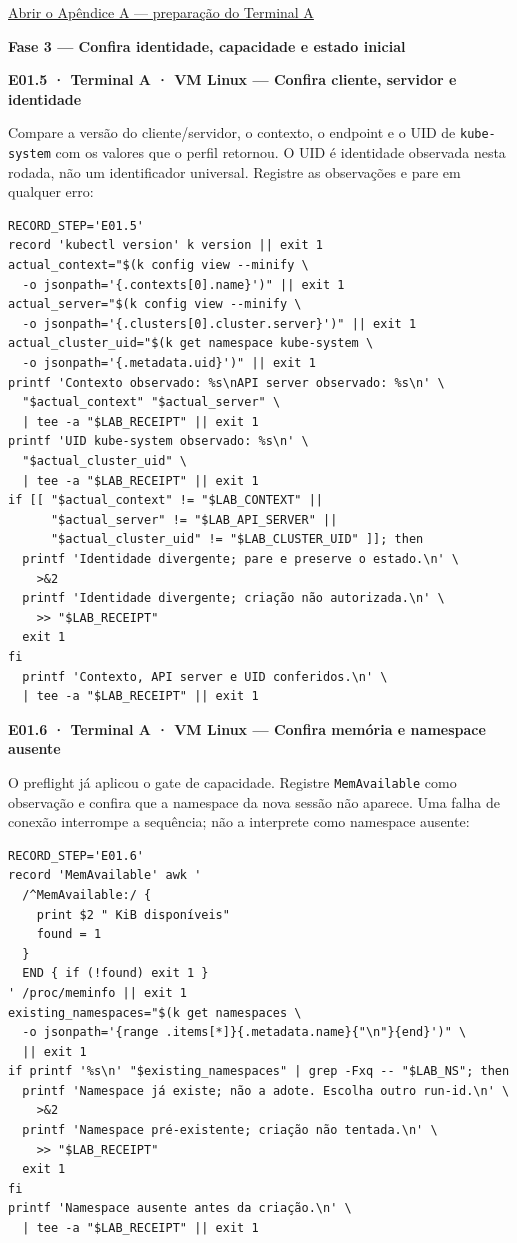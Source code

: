 \documentclass[12pt,openany,oneside,a4paper,chapter=TITLE,english,brazil]{abntex2}
\begin{document}
\hyperlink{p010-preparacao-terminal-a}{Abrir o Apêndice A — preparação do Terminal A}


\textbf{Fase 3 --- Confira identidade, capacidade e estado inicial}

\textbf{E01.5 · Terminal A · VM Linux --- Confira cliente, servidor e identidade}

Compare a versão do cliente/servidor, o contexto, o endpoint e o UID de \texttt{kube-{}\allowbreak{}system} com os valores que o perfil retornou. O UID é identidade observada nesta rodada, não um identificador universal. Registre as observações e pare em qualquer erro:

\begin{verbatim}
RECORD_STEP='E01.5'
record 'kubectl version' k version || exit 1
actual_context="$(k config view --minify \
  -o jsonpath='{.contexts[0].name}')" || exit 1
actual_server="$(k config view --minify \
  -o jsonpath='{.clusters[0].cluster.server}')" || exit 1
actual_cluster_uid="$(k get namespace kube-system \
  -o jsonpath='{.metadata.uid}')" || exit 1
printf 'Contexto observado: %s\nAPI server observado: %s\n' \
  "$actual_context" "$actual_server" \
  | tee -a "$LAB_RECEIPT" || exit 1
printf 'UID kube-system observado: %s\n' \
  "$actual_cluster_uid" \
  | tee -a "$LAB_RECEIPT" || exit 1
if [[ "$actual_context" != "$LAB_CONTEXT" ||
      "$actual_server" != "$LAB_API_SERVER" ||
      "$actual_cluster_uid" != "$LAB_CLUSTER_UID" ]]; then
  printf 'Identidade divergente; pare e preserve o estado.\n' \
    >&2
  printf 'Identidade divergente; criação não autorizada.\n' \
    >> "$LAB_RECEIPT"
  exit 1
fi
  printf 'Contexto, API server e UID conferidos.\n' \
  | tee -a "$LAB_RECEIPT" || exit 1
\end{verbatim}

\textbf{E01.6 · Terminal A · VM Linux --- Confira memória e namespace ausente}

O preflight já aplicou o gate de capacidade. Registre \texttt{Mem\allowbreak{}Available} como observação e confira que a namespace da nova sessão não aparece. Uma falha de conexão interrompe a sequência; não a interprete como namespace ausente:

\begin{verbatim}
RECORD_STEP='E01.6'
record 'MemAvailable' awk '
  /^MemAvailable:/ {
    print $2 " KiB disponíveis"
    found = 1
  }
  END { if (!found) exit 1 }
' /proc/meminfo || exit 1
existing_namespaces="$(k get namespaces \
  -o jsonpath='{range .items[*]}{.metadata.name}{"\n"}{end}')" \
  || exit 1
if printf '%s\n' "$existing_namespaces" | grep -Fxq -- "$LAB_NS"; then
  printf 'Namespace já existe; não a adote. Escolha outro run-id.\n' \
    >&2
  printf 'Namespace pré-existente; criação não tentada.\n' \
    >> "$LAB_RECEIPT"
  exit 1
fi
printf 'Namespace ausente antes da criação.\n' \
  | tee -a "$LAB_RECEIPT" || exit 1
\end{verbatim}
\end{document}
